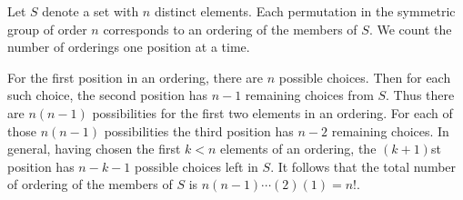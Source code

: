 \documentclass[../algebraNotesMSRI-UP2016.tex]{subfiles}
\begin{document}
\begin{frame}
Let $S$ denote a set with $n$ distinct elements.  Each permutation in the symmetric group of order $n$ corresponds to an ordering of the members of $S$.  We count the number of orderings one position at a time.  

\smallGap
For the first position in an ordering, there are $n$ possible choices.  Then for each such choice, the second position has $n-1$ remaining choices from $S$.  Thus there are $n(n-1)$ possibilities for the first two elements in an ordering.  For each of those $n(n-1)$ possibilities the third position has $n-2$ remaining choices.  In general, having chosen the first $k<n$ elements of an ordering, the $(k+1)$st position has $n-k-1$ possible choices left in $S$.  It follows that the total number of ordering of the members of $S$ is $n(n-1)\cdots(2)(1)=\boxed{n!}$.
\end{frame}

\end{document}
